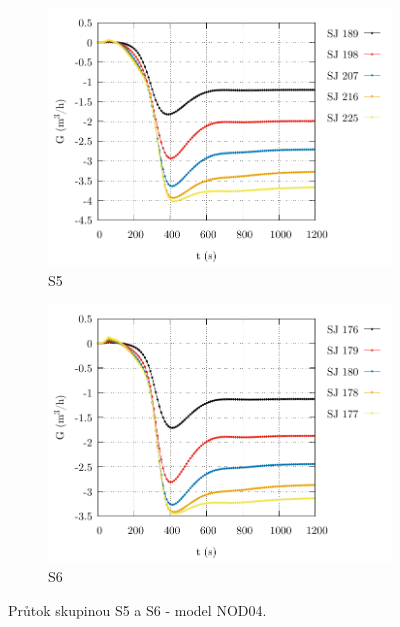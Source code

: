 \begin{figure}
	\centering
	\begin{subfigure}{0.5\textwidth}
		\centering
		\includegraphics[width=\textwidth, trim={0cm 0cm 0cm 0cm}, clip]{./05_TH_model_VR_1/grafy/G_time_nod_04_4.pdf}
		\caption{S5}
		\label{fig:g_time_nod_04_4_prilohy}
	\end{subfigure}%
	\hfill
	\begin{subfigure}{0.5\textwidth}
		\centering
		\includegraphics[width=\textwidth, trim={0cm 0cm 0cm 0cm}, clip]{./05_TH_model_VR_1/grafy/G_time_nod_04_5.pdf}
		\caption{S6}
		\label{fig:g_time_nod_04_5_prilohy}
	\end{subfigure}%
	\caption{Průtok skupinou S5 a S6 - model NOD04.}
\end{figure}